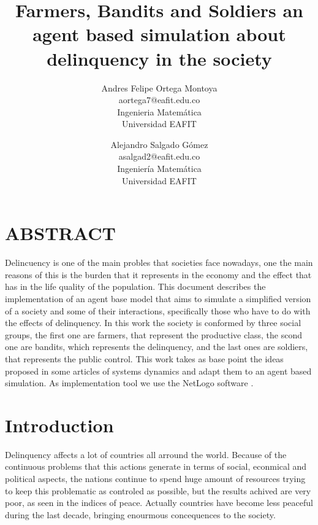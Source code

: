 \documentclass{wscpaperproc}
\theoremstyle{wsc}
\begin{document}

\title{Farmers, Bandits and Soldiers an agent based simulation about delinquency in the
       society}

\author{Andres Felipe Ortega Montoya\\ [12pt]
aortega7@eafit.edu.co\\
Ingenieria Matemática\\
Universidad EAFIT\\
\and
Alejandro Salgado Gómez\\[12pt]
asalgad2@eafit.edu.co\\
Ingeniería Matemática\\
Universidad EAFIT\\
}

\maketitle

\section*{ABSTRACT}
Delincuency is one of the main probles that societies face nowadays,
one the main reasons of this is the burden that it represents in the
economy and the effect that has in the life quality of the population.
This document describes the implementation of an agent base model that aims to
simulate a simplified version of a society and some of their interactions,
specifically those who have to do with the effects of delinquency.
In this work the society is conformed by three social groups, the
first one are farmers, that represent the productive class, the scond
one are bandits, which represents the delinquency, and the last ones
are soldiers, that represents the public control. This work takes as base point
the ideas proposed in some articles of systems dynamics and adapt them to an
agent based simulation. As implementation tool we use the NetLogo software
\cite{netlogo}.

\section{Introduction}

Delinquency affects a lot of countries all arround the world. Because of the
continuous problems that this actions generate in terms of social, econmical and
political aspects, the nations continue to spend huge amount of resources
trying to keep this problematic as controled as possible, but the results achived
are very poor, as seen in the indices of peace. Actually countries have become
less peaceful during the last decade, bringing enourmous concequences to the
society. \cite{peace} \cite{violence}
\end{document}
